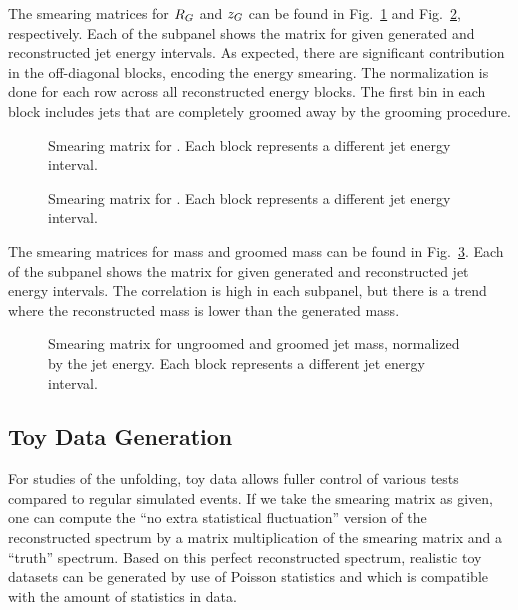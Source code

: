 The smearing matrices for $R_G$ and $z_G$ can be found in Fig.~\ref{Figure:Unfolding-SmearingMatrixRG} and Fig.~\ref{Figure:Unfolding-SmearingMatrixZG}, respectively.  Each of the subpanel shows the matrix for given generated and reconstructed jet energy intervals.  As expected, there are significant contribution in the off-diagonal blocks, encoding the energy smearing.  The normalization is done for each row across all reconstructed energy blocks.  The first bin in each block includes jets that are completely groomed away by the grooming procedure.
%
\begin{figure}[htp!]
    \centering
    \caption{Smearing matrix for \Rg.  Each block represents a different jet energy interval.}
    \label{Figure:Unfolding-SmearingMatrixRG}
\end{figure}


\begin{figure}[htp!]
    \centering
    \caption{Smearing matrix for \zg.  Each block represents a different jet energy interval.}
    \label{Figure:Unfolding-SmearingMatrixZG}
\end{figure}


The smearing matrices for mass and groomed mass can be found in Fig.~\ref{Figure:Unfolding-SmearingMatrixMass}.  Each of the subpanel shows the matrix for given generated and reconstructed jet energy intervals.  The correlation is high in each subpanel, but there is a trend where the reconstructed mass is lower than the generated mass.
%
\begin{figure}[htp!]
    \centering
    \caption{Smearing matrix for ungroomed and groomed jet mass, normalized by the jet energy.  Each block represents a different jet energy interval.}
    \label{Figure:Unfolding-SmearingMatrixMass}
\end{figure}


\subsection{Toy Data Generation}

For studies of the unfolding, toy data allows fuller control of various tests compared to regular simulated events.  If we take the smearing matrix as given, one can compute the ``no extra statistical fluctuation'' version of the reconstructed spectrum by a matrix multiplication of the smearing matrix and a ``truth'' spectrum.  Based on this perfect reconstructed spectrum, realistic toy datasets can be generated by use of Poisson statistics and which is compatible with the amount of statistics in data.

